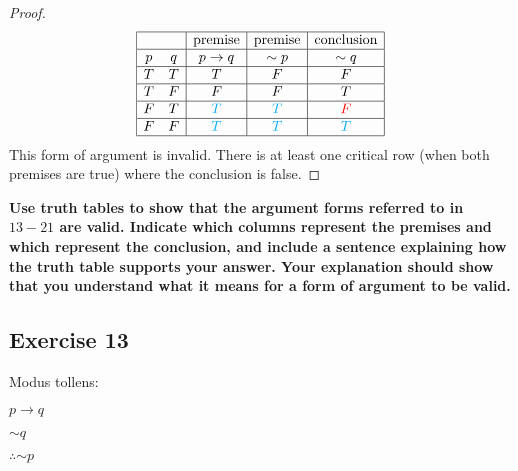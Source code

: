 \documentclass[14pt]{extarticle}
\begin{document}
\begin{proof}
    $$
        \begin{array}{|cc|c|c|c|}
            \hline
                           &                   & \text{premise} &
            \text{premise} & \text{conclusion}                                                   \\
            \hline
            p              & q                 & p \to q        & {\sim p}       & {\sim
            q}                                                                                   \\
            \hline
            T              & T                 & T              & F              & F             \\
            \hline
            T              & F                 & F              & F              & T             \\
            \hline
            F              & T                 & \color{cyan} T & \color{cyan} T & \color{red} F \\ \hline F & F & \color{cyan} T & \color{cyan} T & \color{cyan} T \\
            \hline
        \end{array}
    $$
    This form of argument is invalid. There is at least one critical row (when both premises are true) where the conclusion is false.
\end{proof}

{\bf \color{cyan} Use truth tables to show that the argument forms referred to in $13-21$ are valid. Indicate which columns represent the premises and which represent the conclusion, and include a sentence explaining how the truth table supports your answer. Your explanation should show that you understand what it
means for a form of argument to be valid.}

\subsection{Exercise 13}
Modus tollens:

$p \to q$

${\sim q}$

$\therefore {\sim p}$
\end{document}
